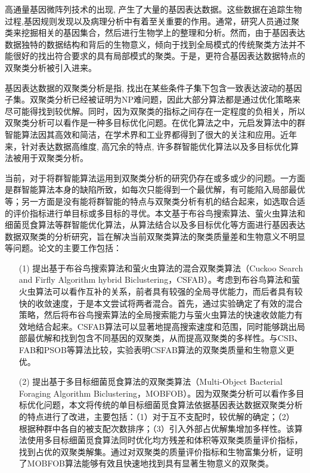 \begin{cabstract}
  高通量基因微阵列技术的出现, 产生了大量的基因表达数据。这些数据在追踪生物过程,基因规则发现以及病理分析中有着至关重要的作用。通常，研究人员通过聚类来挖掘相关的基因集合，然后进行生物学上的整理和分析。然而，由于基因表达数据独特的数据结构和背后的生物意义，倾向于找到全局模式的传统聚类方法并不能很好的找出符合要求的具有局部模式的聚类。于是，更符合基因表达数据特点的双聚类分析被引入进来。
  
  基因表达数据的双聚类分析是指, 找出在某些条件子集下包含一致表达波动的基因子集。双聚类分析已经被证明为NP难问题，因此大部分算法都是通过优化策略来尽可能得找到较优解。同时，因为双聚类的指标之间存在一定程度的负相关，所以双聚类分析可以看作是一种多目标优化问题。在优化算法之中，元启发算法中的群智能算法因其高效和简洁，在学术界和工业界都得到了很大的关注和应用。近年来，针对表达数据高维度, 高冗余的特点, 许多群智能优化算法以及多目标优化算法被用于双聚类分析。

  当前，对于将群智能算法运用到双聚类分析的研究仍存在或多或少的问题。一方面是群智能算法本身的缺陷所致，如每次只能得到一个最优解，有可能陷入局部最优等；另一方面是没有能将群智能的特点与双聚类分析有机的结合起来，如选取合适的评价指标进行单目标或多目标的寻优。本文基于布谷鸟搜索算法、萤火虫算法和细菌觅食算法等群智能优化算法，从算法结合以及多目标优化等方面进行基因表达数据双聚类的分析研究，旨在解决当前双聚类算法的聚类质量差和生物意义不明显等问题。论文的主要工作包括：

  \begin{itemize}
    \item[(1)] 提出基于布谷鸟搜索算法和萤火虫算法的混合双聚类算法（Cuckoo Search and Firfly Algorithm hybrid Biclustering，CSFAB）。考虑到布谷鸟算法和萤火虫算法可以看作互补的关系，前者具有较强的全局寻优能力，而后者具有较快的收敛速度，于是本文尝试将两者混合。首先，通过实验确定了有效的混合策略，然后将布谷鸟搜索算法的全局搜索能力与萤火虫算法的快速收敛能力有效地结合起来。CSFAB算法可以显著地提高搜索速度和范围，同时能够跳出局部最优解和找到包含不同基因的双聚类，从而提高双聚类的多样性。与CSB、FAB和PSOB等算法比较，实验表明CSFAB算法的双聚类质量和生物意义更优。

    \item[(2)] 提出基于多目标细菌觅食算法的双聚类算法（Multi-Object Bacterial Foraging Algorithm Biclustering，MOBFOB）。因为双聚类分析可以看作多目标优化问题，本文将传统的单目标细菌觅食算法依据基因表达数据双聚类分析的特点进行了改进，主要包括：（1）对于互不支配时，较优解的确定；（2） 根据种群中各自的被支配次数排序；（3）引入外部占优解集增加多样性。该算法使用多目标细菌觅食算法同时优化均方残差和体积等双聚类质量评价指标，找到占优的双聚类解集。通过对双聚类的质量评价指标和生物富集分析，证明了MOBFOB算法能够有效且快速地找到具有显著生物意义的双聚类。
  \end{itemize}


\end{cabstract}


